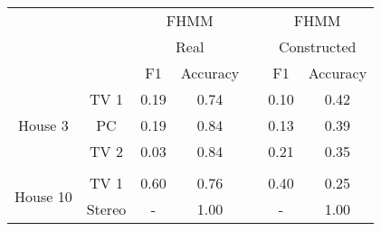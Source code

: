 \begin{table}[H]                             
\centering                                   
\begin{tabular}{ccccccc}
\cline{3-4} \cline{6-7}
\multicolumn{1}{l}{}                            & \multicolumn{1}{c|}{}       & \multicolumn{2}{c|}{FHMM}                                 & \multicolumn{1}{c|}{} & \multicolumn{2}{c|}{FHMM}                                 \\
\multicolumn{1}{l}{}                            & \multicolumn{1}{c|}{}       & \multicolumn{2}{c|}{Real}                                 & \multicolumn{1}{c|}{} & \multicolumn{2}{c|}{Constructed}                          \\ \cline{3-4} \cline{6-7} 
\multicolumn{1}{l}{}                            & \multicolumn{1}{c|}{}       & \multicolumn{1}{c|}{F1}   & \multicolumn{1}{c|}{Accuracy} & \multicolumn{1}{c|}{} & \multicolumn{1}{c|}{F1}   & \multicolumn{1}{c|}{Accuracy} \\ \cline{1-4} \cline{6-7} 
\multicolumn{1}{|c|}{\multirow{3}{*}{House 3}}  & \multicolumn{1}{c|}{TV 1}   & \multicolumn{1}{c|}{0.19} & \multicolumn{1}{c|}{0.74}     & \multicolumn{1}{c|}{} & \multicolumn{1}{c|}{0.10} & \multicolumn{1}{c|}{0.42}     \\ \cline{2-4} \cline{6-7} 
\multicolumn{1}{|c|}{}                          & \multicolumn{1}{c|}{PC}     & \multicolumn{1}{c|}{0.19} & \multicolumn{1}{c|}{0.84}     & \multicolumn{1}{c|}{} & \multicolumn{1}{c|}{0.13} & \multicolumn{1}{c|}{0.39}     \\ \cline{2-4} \cline{6-7} 
\multicolumn{1}{|c|}{}                          & \multicolumn{1}{c|}{TV 2}   & \multicolumn{1}{c|}{0.03} & \multicolumn{1}{c|}{0.84}     & \multicolumn{1}{c|}{} & \multicolumn{1}{c|}{0.21} & \multicolumn{1}{c|}{0.35}     \\ \cline{1-4} \cline{6-7} 
\multicolumn{1}{l}{}                            &                             &                           &                               &                       &                           &                               \\ \cline{1-4} \cline{6-7} 
\multicolumn{1}{|c|}{\multirow{4}{*}{House 10}} & \multicolumn{1}{c|}{TV 1}   & \multicolumn{1}{c|}{0.60} & \multicolumn{1}{c|}{0.76}     & \multicolumn{1}{c|}{} & \multicolumn{1}{c|}{0.40} & \multicolumn{1}{c|}{0.25}     \\ \cline{2-4} \cline{6-7} 
\multicolumn{1}{|c|}{}                          & \multicolumn{1}{c|}{Stereo} & \multicolumn{1}{c|}{-}    & \multicolumn{1}{c|}{1.00}     & \multicolumn{1}{c|}{} & \multicolumn{1}{c|}{-}    & \multicolumn{1}{c|}{1.00}     \\ \cline{2-4} \cline{6-7} 

\end{tabular}
\end{table}
